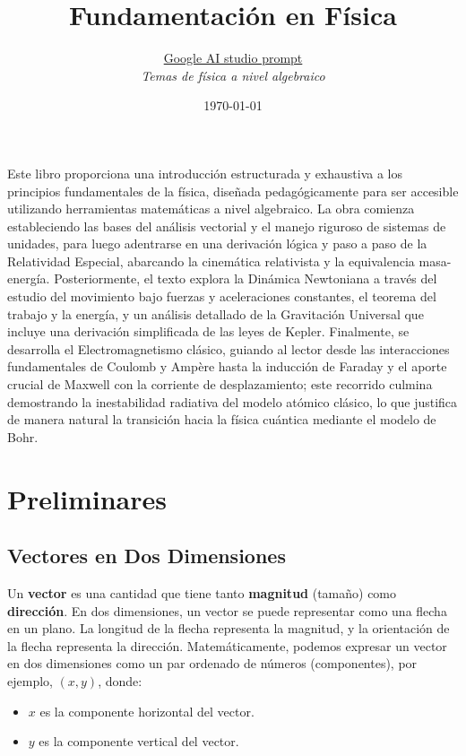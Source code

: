 \documentclass[11pt,a4paper]{book}
\title{Fundamentación en Física}
\author{\href{https://bit.ly/lorentztransformation}{Google AI studio prompt}\\ \small \emph{Temas de física a nivel algebraico}}
\date{\today}
\newenvironment{abstract}{}{}
\begin{document}
\maketitle
\tableofcontents


\begin{abstract}

Este libro proporciona una introducción estructurada y exhaustiva a los principios fundamentales de la física, diseñada pedagógicamente para ser accesible utilizando herramientas matemáticas a nivel algebraico. La obra comienza estableciendo las bases del análisis vectorial y el manejo riguroso de sistemas de unidades, para luego adentrarse en una derivación lógica y paso a paso de la Relatividad Especial, abarcando la cinemática relativista y la equivalencia masa-energía. Posteriormente, el texto explora la Dinámica Newtoniana a través del estudio del movimiento bajo fuerzas y aceleraciones constantes, el teorema del trabajo y la energía, y un análisis detallado de la Gravitación Universal que incluye una derivación simplificada de las leyes de Kepler. Finalmente, se desarrolla el Electromagnetismo clásico, guiando al lector desde las interacciones fundamentales de Coulomb y Ampère hasta la inducción de Faraday y el aporte crucial de Maxwell con la corriente de desplazamiento; este recorrido culmina demostrando la inestabilidad radiativa del modelo atómico clásico, lo que justifica de manera natural la transición hacia la física cuántica mediante el modelo de Bohr.
\end{abstract}



\chapter{Preliminares}

\section{Vectores en Dos Dimensiones}

Un \textbf{vector} es una cantidad que tiene tanto \textbf{magnitud} (tamaño) como \textbf{dirección}. En dos dimensiones, un vector se puede representar como una flecha en un plano.  La longitud de la flecha representa la magnitud, y la orientación de la flecha representa la dirección.  Matemáticamente, podemos expresar un vector en dos dimensiones como un par ordenado de números (componentes), por ejemplo, $(x, y)$, donde:
\begin{itemize}
    \item $x$ es la componente horizontal del vector.
    \item $y$ es la componente vertical del vector.
\end{itemize}
\end{document}
